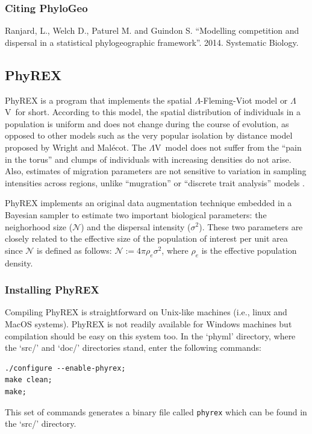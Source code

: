 \documentclass[a4paper,12pt]{article}
\newcommand{\x}[1]{\texttt{#1}}
\newcommand{\sfv}{$\Lambda$V}
\begin{document}
\subsubsection{Citing PhyloGeo}\label{sec:citephylogeo}

Ranjard, L., Welch D., Paturel M. and Guindon S. ``Modelling competition  and  dispersal in a
statistical phylogeographic framework''. 2014. Systematic Biology.



\subsection{PhyREX} PhyREX is a program that implements the spatial
$\Lambda$-Fleming-Viot model
\cite{etheridge2008,berestycki2009,barton2010,barton2010b,veber2012,barton2013} or \sfv\ for short. 
According to this model, the spatial distribution of individuals in a population is uniform and does
not change during the course of evolution, as opposed to other models such as the very popular
isolation by distance model proposed by Wright and Mal\'ecot. The \sfv\ model  does not
suffer from the ``pain in the torus'' \cite{felsenstein1975} and clumps of individuals with
increasing densities do not arise. Also, estimates of migration parameters are not sensitive to
variation in sampling intensities across regions, unlike ``mugration'' or ``discrete trait
analysis'' models \cite{lemey2009}.

PhyREX implements an original data augmentation technique embedded in a Bayesian sampler to
estimate two important biological parameters: the neighorhood size ($\mathcal{N}$) and the dispersal
intensity ($\sigma^2$). These two parameters are closely related to the effective size of the
population of interest per unit area since $\mathcal{N}$ is defined as follows: $\mathcal{N} := 4\pi
\rho_e \sigma^2$, where $\rho_e$ is the effective population density.

\subsubsection{Installing PhyREX}

Compiling PhyREX is straightforward on Unix-like  machines (i.e., linux and MacOS systems). PhyREX
is not readily available for Windows machines but  compilation should be easy on this system too. In
the `phyml' directory, where the `src/'  and `doc/' directories stand, enter the following commands:
{\setlength{\baselineskip}{0.5\baselineskip}
\begin{verbatim}
./configure --enable-phyrex;
make clean;
make;
\end{verbatim} } This set of commands generates  a binary file called \x{phyrex} which can be found
  in the `src/' directory.
\end{document}
